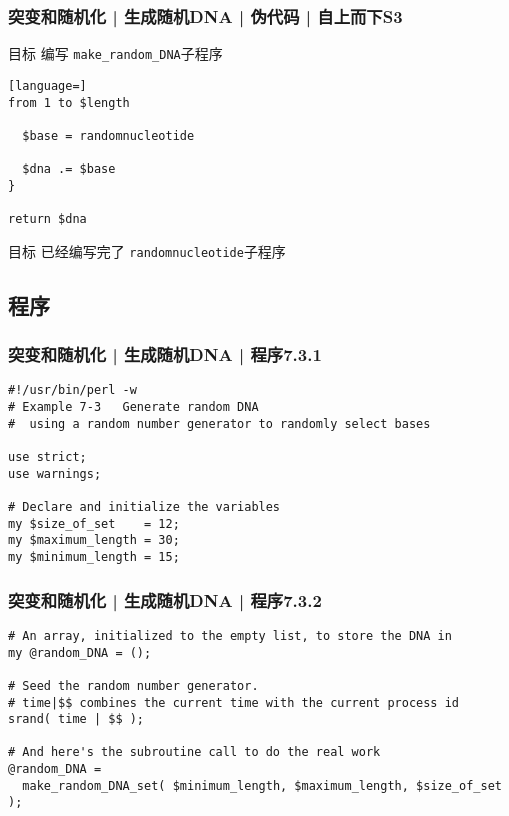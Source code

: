 \begin{frame}[fragile]
  \frametitle{突变和随机化 | 生成随机DNA | 伪代码 | 自上而下S3}
  \begin{block}{目标}
    编写 \verb|make_random_DNA|子程序
  \end{block}
  \pause
  \vspace{-1.5em}
\begin{lstlisting}[language=]
from 1 to $length

  $base = randomnucleotide

  $dna .= $base
}

return $dna
\end{lstlisting}
\pause
\vspace{-0.5em}
  \begin{block}{目标}
    已经编写完了 \verb|randomnucleotide|子程序
  \end{block}
\end{frame}

\subsection{程序}
\begin{frame}[fragile]
  \frametitle{突变和随机化 | 生成随机DNA | 程序7.3.1}
  \vspace{-1.5em}
\begin{lstlisting}[firstnumber=1]
#!/usr/bin/perl -w
# Example 7-3   Generate random DNA
#  using a random number generator to randomly select bases

use strict;
use warnings;

# Declare and initialize the variables
my $size_of_set    = 12;
my $maximum_length = 30;
my $minimum_length = 15;
\end{lstlisting}
\end{frame}

\begin{frame}[fragile]
  \frametitle{突变和随机化 | 生成随机DNA | 程序7.3.2}
  \vspace{-1.5em}
\begin{lstlisting}[firstnumber=13]
# An array, initialized to the empty list, to store the DNA in
my @random_DNA = ();

# Seed the random number generator.
# time|$$ combines the current time with the current process id
srand( time | $$ );

# And here's the subroutine call to do the real work
@random_DNA =
  make_random_DNA_set( $minimum_length, $maximum_length, $size_of_set );
\end{lstlisting}
\end{frame}

